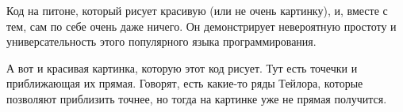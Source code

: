 \documentclass{article}
\begin{document}
    \par Код на питоне, который рисует красивую (или не очень картинку), и, вместе с тем, сам по себе очень даже ничего. Он демонстрирует невероятную простоту и универсательность этого  популярного языка программирования.
    
    \par А вот и красивая картинка, которую этот код рисует. Тут есть точечки и приближающая их прямая. Говорят, есть какие-то ряды Тейлора, которые позволяют приблизить точнее, но тогда на картинке уже не прямая получится.
\end{document}
